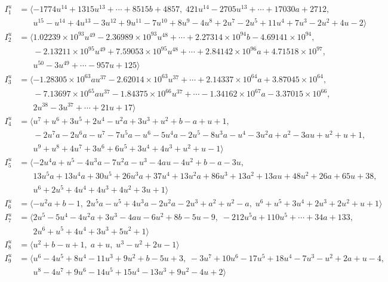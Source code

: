 \documentclass[1p]{elsarticle_modified}
\theoremstyle{definition}
\begin{document}
\begin{align*}
I^u_{1}&=\langle 
-1774 u^{14}+1315 u^{13}+\cdots+8515 b+4857,\;421 u^{14}-2705 u^{13}+\cdots+17030 a+2712,\\
\phantom{I^u_{1}}&\phantom{= \langle  }u^{15}- u^{14}+4 u^{13}-3 u^{12}+9 u^{11}-7 u^{10}+8 u^9-4 u^8+2 u^7-2 u^5+11 u^4+7 u^3-2 u^2+4 u-2\rangle \\
I^u_{2}&=\langle 
1.02239\times10^{93} u^{49}-2.36989\times10^{93} u^{48}+\cdots+2.27314\times10^{94} b-4.69141\times10^{94},\\
\phantom{I^u_{2}}&\phantom{= \langle  }-2.13211\times10^{95} u^{49}+7.59053\times10^{95} u^{48}+\cdots+2.84142\times10^{96} a+4.71518\times10^{97},\\
\phantom{I^u_{2}}&\phantom{= \langle  }u^{50}-3 u^{49}+\cdots-957 u+125\rangle \\
I^u_{3}&=\langle 
-1.28305\times10^{63} a u^{37}-2.62014\times10^{63} u^{37}+\cdots+2.14337\times10^{64} a+3.87045\times10^{64},\\
\phantom{I^u_{3}}&\phantom{= \langle  }-7.13697\times10^{65} a u^{37}-1.84375\times10^{66} u^{37}+\cdots-1.34162\times10^{67} a-3.37015\times10^{66},\\
\phantom{I^u_{3}}&\phantom{= \langle  }2 u^{38}-3 u^{37}+\cdots+21 u+17\rangle \\
I^u_{4}&=\langle 
u^7+u^6+3 u^5+2 u^4- u^2 a+3 u^3+u^2+b- a+u+1,\\
\phantom{I^u_{4}}&\phantom{= \langle  }-2 u^7 a-2 u^6 a- u^7-7 u^5 a- u^6-5 u^4 a-2 u^5-8 u^3 a- u^4-3 u^2 a+a^2-3 a u+u^2+u+1,\\
\phantom{I^u_{4}}&\phantom{= \langle  }u^9+u^8+4 u^7+3 u^6+6 u^5+3 u^4+4 u^3+u^2+u-1\rangle \\
I^u_{5}&=\langle 
-2 u^4 a+u^5-4 u^3 a-7 u^2 a- u^3-4 a u-4 u^2+b- a-3 u,\\
\phantom{I^u_{5}}&\phantom{= \langle  }13 u^5 a+13 u^4 a+30 u^5+26 u^3 a+37 u^4+13 u^2 a+86 u^3+13 a^2+13 a u+48 u^2+26 a+65 u+38,\\
\phantom{I^u_{5}}&\phantom{= \langle  }u^6+2 u^5+4 u^4+4 u^3+4 u^2+3 u+1\rangle \\
I^u_{6}&=\langle 
- u^2 a+b-1,\;2 u^5 a- u^5+4 u^3 a-2 u^2 a-2 u^3+a^2+u^2- a,\;u^6+u^5+3 u^4+2 u^3+2 u^2+u+1\rangle \\
I^u_{7}&=\langle 
2 u^5-5 u^4-4 u^2 a+3 u^3-4 a u-6 u^2+8 b-5 u-9,\;-212 u^5 a+110 u^5+\cdots+34 a+133,\\
\phantom{I^u_{7}}&\phantom{= \langle  }2 u^6+u^5+4 u^4+3 u^3+5 u^2+1\rangle \\
I^u_{8}&=\langle 
u^2+b- u+1,\;a+u,\;u^3- u^2+2 u-1\rangle \\
I^u_{9}&=\langle 
u^6-4 u^5+8 u^4-11 u^3+9 u^2+b-5 u+3,\;-3 u^7+10 u^6-17 u^5+18 u^4-7 u^3- u^2+2 a+u-4,\\
\phantom{I^u_{9}}&\phantom{= \langle  }u^8-4 u^7+9 u^6-14 u^5+15 u^4-13 u^3+9 u^2-4 u+2\rangle \\
\\
\end{align*}
\end{document}
